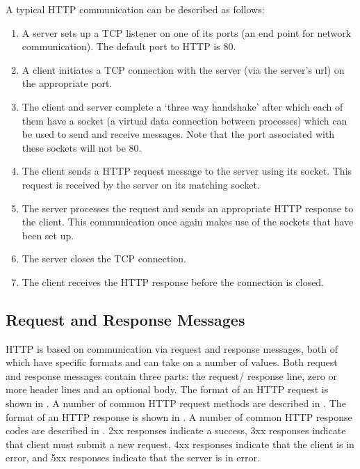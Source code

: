 \documentclass[10pt,twocolumn]{witseiepaper}
\begin{document}
A typical HTTP communication can be described as follows: 
\begin{enumerate}
	\item A server sets up a TCP listener on one of its ports (an end point for network communication). The default port to HTTP is 80. 
	\item A client initiates a TCP connection with the server (via the server's url) on the appropriate port. 
	\item The client and server complete a `three way handshake' after which each of them have a socket (a virtual data connection between processes) which can be used to send and receive messages. Note that the port associated with these sockets will not be 80.
	\item The client sends a HTTP request message to the server using its socket. This request is received by the server on its matching socket.
	\item The server processes the request and sends an appropriate HTTP response to the client. This communication once again makes use of the sockets that have been set up. 
	\item The server closes the TCP connection.
	\item The client receives the HTTP response before the connection is closed.
\end{enumerate}

	\subsection{Request and Response Messages} \label{formats}

	HTTP is based on communication via request and response messages, both of which have specific formats and can take on a number of values. Both request and response messages contain three parts: the request/ response line, zero or more header lines and an optional body. The format of an HTTP request is shown in . A number of common HTTP request methods are described in . The format of an HTTP response is shown in . A number of common HTTP response codes are described in . 2xx responses indicate a success, 3xx responses indicate that client must submit a new request, 4xx responses indicate that the client is in error, and 5xx responses indicate that the server is in error.
\end{document}
